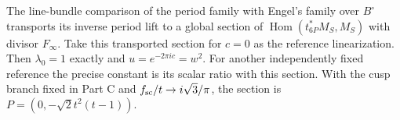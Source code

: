 \begin{proposition}\hypertarget{tag-01QA}{}\label{fam:src:B.1.4}\label{fam:st:B.1.4}

The line-bundle comparison of the period family with Engel's family over $B^\circ$ transports its inverse period lift to a global section of $\operatorname{Hom}(t_{6P}^*M_S,M_S)$ with divisor $F_\infty$. Take this transported section for $c=0$ as the reference linearization. Then $\lambda_0=1$ exactly and $u=e^{-2\pi ic}=w^2$. For another independently fixed reference the precise constant is its scalar ratio with this section. With the cusp branch fixed in Part C and $f_{\rm sc}/t\to i\sqrt3/\pi$, the section is $P=(0,-\sqrt2t^2(t-1))$.
\end{proposition}



